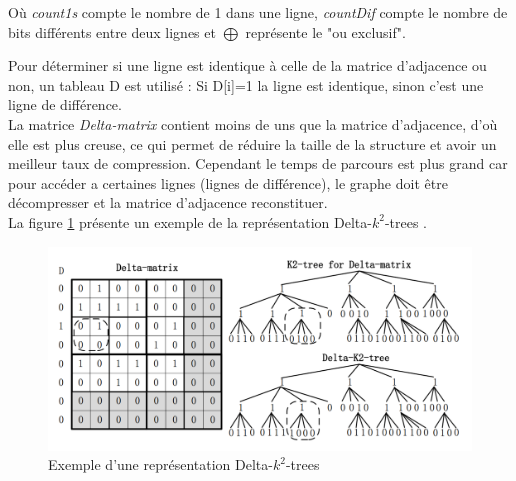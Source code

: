 Où \textit{count1s} compte le nombre de 1 dans une ligne, \textit{countDif} compte le nombre de bits différents entre deux lignes et $\bigoplus$ représente le "ou exclusif".

Pour déterminer si une ligne est identique à celle de la matrice d'adjacence ou non, un tableau D est utilisé : Si D[i]=1 la ligne est identique, sinon c'est une ligne de différence.\\
La matrice \textit{Delta-matrix} contient moins de uns que la matrice d'adjacence, d'où elle est plus creuse, ce qui permet de réduire la taille de la structure et avoir un meilleur taux de compression. Cependant le temps de parcours est plus grand car pour accéder a certaines lignes (lignes de différence), le graphe doit être décompresser et la matrice d'adjacence reconstituer.\\
La figure \ref{k2-trees-delta} présente un exemple de la représentation Delta-$k^2$-trees \citep{zhang2014delta}.


\begin{figure}[H]
\begin{center}
\includegraphics[height=150 pt, width=380 pt]{./ressources/image/k2-trees-delta.png} 
\end{center}
\caption{Exemple d'une représentation Delta-$k^2$-trees}
\label{k2-trees-delta}
\end{figure}

